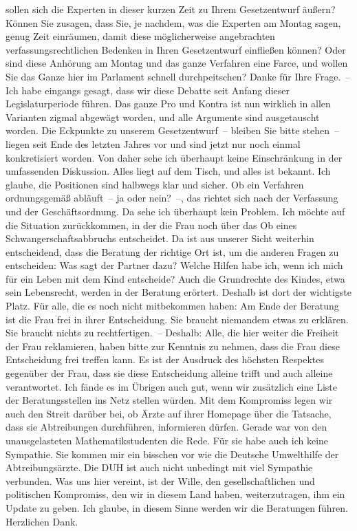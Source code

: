 \documentclass{article}
\begin{document}
sollen sich die Experten in dieser kurzen Zeit zu Ihrem Gesetzentwurf äußern? Können Sie zusagen, dass Sie, je nachdem, was die Experten am Montag sagen, genug Zeit einräumen, damit diese möglicherweise angebrachten verfassungsrechtlichen Bedenken in Ihren Gesetzentwurf einfließen können? Oder sind diese Anhörung am Montag und das ganze Verfahren eine Farce, und wollen Sie das Ganze hier im Parlament schnell durchpeitschen?  Danke für Ihre Frage. – Ich habe eingangs gesagt, dass wir diese Debatte seit Anfang dieser Legislaturperiode führen. Das ganze Pro und Kontra ist nun wirklich in allen Varianten zigmal abgewägt worden, und alle Argumente sind ausgetauscht worden.  Die Eckpunkte zu unserem Gesetzentwurf – bleiben Sie bitte stehen – liegen seit Ende des letzten Jahres vor und sind jetzt nur noch einmal konkretisiert worden. Von daher sehe ich überhaupt keine Einschränkung in der umfassenden Diskussion. Alles liegt auf dem Tisch, und alles ist bekannt. Ich glaube, die Positionen sind halbwegs klar und sicher.  Ob ein Verfahren ordnungsgemäß abläuft – ja oder nein? –, das richtet sich nach der Verfassung und der Geschäftsordnung. Da sehe ich überhaupt kein Problem.  Ich möchte auf die Situation zurückkommen, in der die Frau noch über das Ob eines Schwangerschaftsabbruchs entscheidet. Da ist aus unserer Sicht weiterhin entscheidend, dass die Beratung der richtige Ort ist, um die anderen Fragen zu entscheiden: Was sagt der Partner dazu? Welche Hilfen habe ich, wenn ich mich für ein Leben mit dem Kind entscheide? Auch die Grundrechte des Kindes, etwa sein Lebensrecht, werden in der Beratung erörtert. Deshalb ist dort der wichtigste Platz. Für alle, die es noch nicht mitbekommen haben: Am Ende der Beratung ist die Frau frei in ihrer Entscheidung. Sie braucht niemandem etwas zu erklären. Sie braucht nichts zu rechtfertigen. – Deshalb: Alle, die hier weiter die Freiheit der Frau reklamieren, haben bitte zur Kenntnis zu nehmen, dass die Frau diese Entscheidung frei treffen kann. Es ist der Ausdruck des höchsten Respektes gegenüber der Frau, dass sie diese Entscheidung alleine trifft und auch alleine verantwortet.  Ich fände es im Übrigen auch gut, wenn wir zusätzlich eine Liste der Beratungsstellen ins Netz stellen würden.  Mit dem Kompromiss legen wir auch den Streit darüber bei, ob Ärzte auf ihrer Homepage über die Tatsache, dass sie Abtreibungen durchführen, informieren dürfen. Gerade war von den unausgelasteten Mathematikstudenten die Rede. Für sie habe auch ich keine Sympathie. Sie kommen mir ein bisschen vor wie die Deutsche Umwelthilfe der Abtreibungsärzte.  Die DUH ist auch nicht unbedingt mit viel Sympathie verbunden. Was uns hier vereint, ist der Wille, den gesellschaftlichen und politischen Kompromiss, den wir in diesem Land haben, weiterzutragen, ihm ein Update zu geben. Ich glaube, in diesem Sinne werden wir die Beratungen führen. Herzlichen Dank.  
\end{document}
